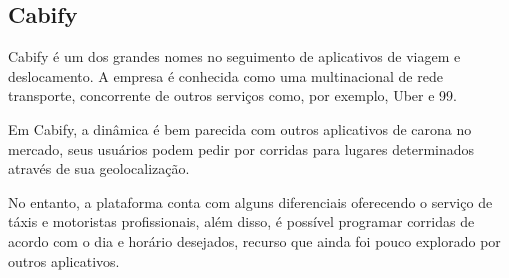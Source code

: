 \subsection{Cabify}

Cabify é um dos grandes nomes no seguimento de aplicativos de viagem e deslocamento. A empresa é conhecida como uma multinacional de rede transporte, concorrente de outros serviços como, por exemplo, Uber e 99.

Em Cabify, a dinâmica é bem parecida com outros aplicativos de carona no mercado, seus usuários podem pedir por corridas para lugares determinados através de sua geolocalização.

No entanto, a plataforma conta com alguns diferenciais oferecendo o serviço de táxis e motoristas profissionais, além disso, é possível programar corridas de acordo com o dia e horário desejados, recurso que ainda foi pouco explorado por outros aplicativos. 


